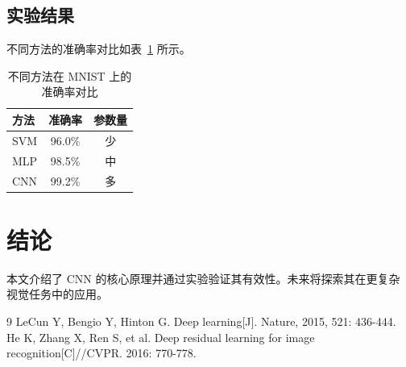 \documentclass[UTF8]{ctexart}
\begin{document}
\subsection{实验结果}
不同方法的准确率对比如表~\ref{tab:res} 所示。

\begin{table}[htbp]
    \centering
    \caption{不同方法在 MNIST 上的准确率对比}
    \begin{tabular}{lcc}
        \toprule
        方法 & 准确率 & 参数量 \\
        \midrule
        SVM & 96.0\% & 少 \\
        MLP & 98.5\% & 中 \\
        CNN & 99.2\% & 多 \\
        \bottomrule
    \end{tabular}
    \label{tab:res}
\end{table}

\section{结论}
本文介绍了 CNN 的核心原理并通过实验验证其有效性。未来将探索其在更复杂
视觉任务中的应用。

\begin{thebibliography}{9}
     LeCun Y, Bengio Y, Hinton G. Deep learning[J]. Nature, 2015, 521: 436-444.
     He K, Zhang X, Ren S, et al. Deep residual learning for image recognition[C]//CVPR. 2016: 770-778.
\end{thebibliography}
\end{document}
